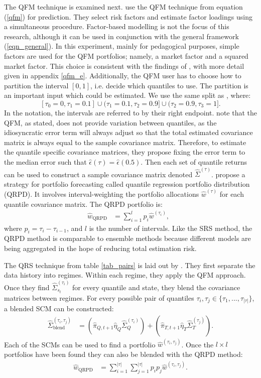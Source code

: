 \documentclass[a4paper,11pt,nocenter,bold,noupper,headcount]{mythesis}
\theoremstyle{plain}
\theoremstyle{definition}
\begin{document}
The QFM technique is examined next. \cite{CDG19} use the QFM technique from equation (\ref{qfm}) for prediction. They select risk factors and estimate factor loadings using a simultaneous procedure. Factor-based modelling is not the focus of this research, although it can be used in conjunction with the general framework (\ref{eqn_general}). In this experiment, mainly for pedagogical purposes, simple factors are used for the QFM portfolios; namely, a market factor and a squared market factor. This choice is consistent with the findings of \cite{TM66}, with more detail given in appendix \ref{qfm_e}. Additionally, the QFM user has to choose how to partition the interval $[0, 1]$, i.e. decide which quantiles to use. The partition is an important input which could be estimated. We use the same split as \cite{MP08}, where: $$[\tau_0 = 0, \tau_1 = 0.1]\cup(\tau_1 = 0.1, \tau_2 = 0.9] \cup (\tau_2 = 0.9, \tau_3 = 1].$$  In the notation, the intervals are referred to by their right endpoint. \cite{FD18} note that the QFM, as stated, does not provide variation between quantiles, as the idiosyncratic error term will always adjust so that the total estimated covariance matrix is always equal to the sample covariance matrix. Therefore, to estimate the quantile specific covariance matrices, they propose fixing the error term to the median error such that $\hat{\epsilon}(\tau) = \hat{\epsilon}(0.5)$. Then each set of quantile returns can be used to construct a sample covariance matrix denoted $\hat{\Sigma}^{(\tau)}$. \cite{MP08} propose a strategy for portfolio forecasting called quantile regression portfolio distribution (QRPD). It involves interval-weighting the portfolio allocations $\hat{w}^{(\tau)}$ for each quantile covariance matrix. The QRPD portfolio is:
\begin{align}
\hat{w}_{\text{QRPD}} & = \sum_{i = 1}^{l} p_i\hat{w}^{(\tau_i)},\;\;
\end{align}
where $p_i = \tau_i - \tau_{i - 1}$, and $l$ is the number of intervals. Like the SRS method, the QRPD method is comparable to ensemble methods because different models are being aggregated in the hope of reducing total estimation risk.

The QRS technique from table \ref{tab_pairs} is laid out by \cite{FD18}. They first separate the data history into regimes. Within each regime, they apply the QFM approach. Once they find $\hat{\Sigma}_{s_t}^{(\tau_i)}$ for every quantile and state, they blend the covariance matrices between regimes. For every possible pair of quantiles $\tau_i, \tau_j \in \{\tau_1, ..., \tau_{|\tau|}\}$, a blended SCM can be constructed:
\begin{align}
\hat{\Sigma}^{(\tau_i, \tau_j)}_{\text{blend}} & = (\hat{\pi}_{Q, t  + 1}\hat{\eta}_Q\hat{\Sigma}^{(\tau_i)}_Q) + (\hat{\pi}_{T, t  + 1}\hat{\eta}_T\hat{\Sigma}^{(\tau_j)}_T).
\end{align}
Each of the SCMs can be used to find a portfolio $\hat{w}^{(\tau_i, \tau_j)}$. Once the $l \times l$ portfolios have been found they can also be blended with the QRPD method:
\begin{align}
\hat{w}_{\text{QRPD}} & =  \sum_{i = 1}^{|\tau|}  \sum_{j = 1}^{|\tau|} p_i p_j \hat{w}^{(\tau_i, \tau_j)}.
\end{align}
\end{document}
